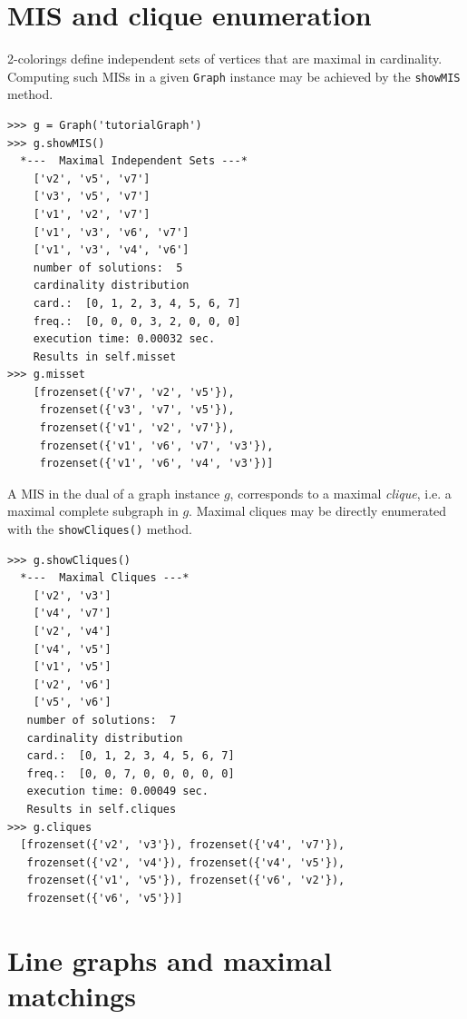\section{MIS and clique enumeration}
\label{sec:21.3}

2-colorings define independent sets of vertices that are maximal in cardinality. Computing such MISs in a given \texttt{Graph} instance may be achieved by the \texttt{showMIS} method.
\begin{lstlisting}
>>> g = Graph('tutorialGraph')
>>> g.showMIS()
  *---  Maximal Independent Sets ---*
    ['v2', 'v5', 'v7']
    ['v3', 'v5', 'v7']
    ['v1', 'v2', 'v7']
    ['v1', 'v3', 'v6', 'v7']
    ['v1', 'v3', 'v4', 'v6']
    number of solutions:  5
    cardinality distribution
    card.:  [0, 1, 2, 3, 4, 5, 6, 7]
    freq.:  [0, 0, 0, 3, 2, 0, 0, 0]
    execution time: 0.00032 sec.
    Results in self.misset
>>> g.misset
    [frozenset({'v7', 'v2', 'v5'}), 
     frozenset({'v3', 'v7', 'v5'}), 
     frozenset({'v1', 'v2', 'v7'}), 
     frozenset({'v1', 'v6', 'v7', 'v3'}), 
     frozenset({'v1', 'v6', 'v4', 'v3'})]
\end{lstlisting}

A MIS in the dual of a graph instance $g$, corresponds to a maximal \emph{clique}, i.e. a maximal complete subgraph in $g$. Maximal cliques may be directly enumerated with the \texttt{showCliques()} method.
\begin{lstlisting}
>>> g.showCliques()
  *---  Maximal Cliques ---*
    ['v2', 'v3']
    ['v4', 'v7']
    ['v2', 'v4']
    ['v4', 'v5']
    ['v1', 'v5']
    ['v2', 'v6']
    ['v5', 'v6']
   number of solutions:  7
   cardinality distribution
   card.:  [0, 1, 2, 3, 4, 5, 6, 7]
   freq.:  [0, 0, 7, 0, 0, 0, 0, 0]
   execution time: 0.00049 sec.
   Results in self.cliques
>>> g.cliques
  [frozenset({'v2', 'v3'}), frozenset({'v4', 'v7'}), 
   frozenset({'v2', 'v4'}), frozenset({'v4', 'v5'}), 
   frozenset({'v1', 'v5'}), frozenset({'v6', 'v2'}), 
   frozenset({'v6', 'v5'})]
\end{lstlisting}

\section{Line graphs and maximal matchings}
\label{sec:21.4}

